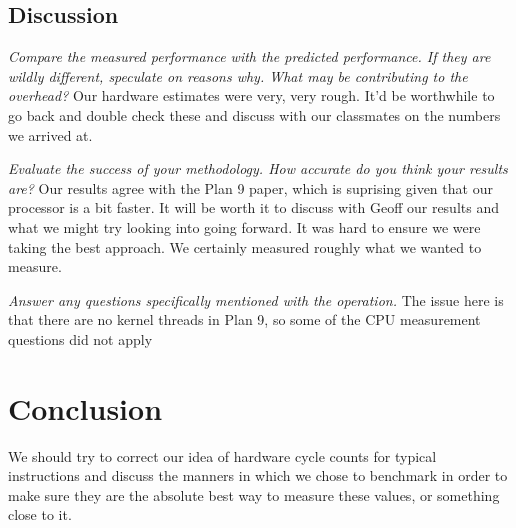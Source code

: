 \documentclass[letterpaper,twocolumn,10pt]{article}
\begin{document}
\subsection{Discussion}
\textit{Compare the measured performance with the predicted performance. If they are wildly different, speculate on reasons why. What may be contributing to the overhead?}
    Our hardware estimates were very, very rough. It'd be worthwhile to go back and double check these and discuss with our classmates on the numbers we arrived at.

    
    \textit{Evaluate the success of your methodology. How accurate do you think your results are?}
    Our results agree with the Plan 9 paper, which is suprising given that our processor is a bit faster. It will be worth it to discuss with Geoff our results and what we might try looking into going forward. It was hard to ensure we were taking the best approach. We certainly measured roughly what we wanted to measure.

\textit{Answer any questions specifically mentioned with the operation.}
The issue here is that there are no kernel threads in Plan 9, so some of the CPU measurement questions did not apply

\section{Conclusion}

We should try to correct our idea of hardware cycle counts for typical instructions and discuss the manners in which we chose to benchmark in order to make sure they are the absolute best way to measure these values, or something close to it. 

{\normalsize 
}


\end{document}
